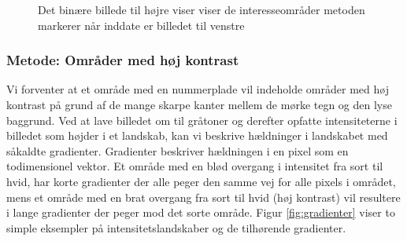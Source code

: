 \begin{figure}[htbp]
  \centering
  \begin{minipage}[b]{5 cm}
  \end{minipage}
  \begin{minipage}[b]{5 cm}
  \end{minipage}
  \caption{Det binære billede til højre viser viser de interesseområder metoden markerer når inddate er billedet til venstre}
  \label{fig:DetectSameness-binary}
\end{figure}



\subsubsection{Metode: Områder med høj kontrast}
\label{sec:DetectContrastAvg}
Vi forventer at et område med en nummerplade vil indeholde områder med høj kontrast på grund af de mange skarpe kanter mellem de mørke tegn og den lyse baggrund. Ved at lave billedet om til gråtoner og derefter opfatte intensiteterne i billedet som højder i et landskab, kan vi beskrive hældninger i landskabet med såkaldte gradienter. Gradienter beskriver hældningen i en pixel som en todimensionel vektor. Et område med en blød overgang i intensitet fra sort til hvid, har korte gradienter der alle peger den samme vej for alle pixels i området, mens et område med en brat overgang fra sort til hvid (høj kontrast) vil resultere i lange gradienter der peger mod det sorte område. Figur \vref{fig:gradienter} viser to simple eksempler på intensitetslandskaber og de tilhørende gradienter.


